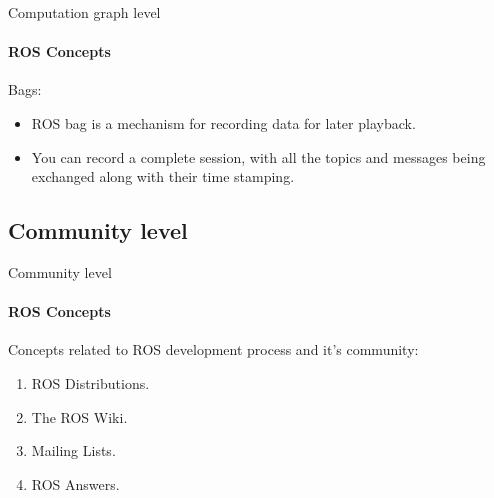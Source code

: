 \documentclass{beamer}
\begin{document}
\begin{frame}{Computation graph level}
    \framesubtitle{ROS Concepts}
    {\huge Bags:}
    \vspace{0.2cm}
    \begin{itemize}
        \item ROS bag is a mechanism for recording data for later playback.
        \item You can record a complete session, with all the topics and messages
        being exchanged along with their time stamping.
    \end{itemize}  
\end{frame}
    
\subsection{Community level}
\begin{frame}{Community level}
    \framesubtitle{ROS Concepts}
    
    Concepts related to ROS development process and it's community:
    
    \begin{enumerate}
        \item ROS Distributions.
        \item The ROS Wiki.
        \item Mailing Lists.
        \item ROS Answers.
    \end{enumerate}
\end{frame}
\end{document}

